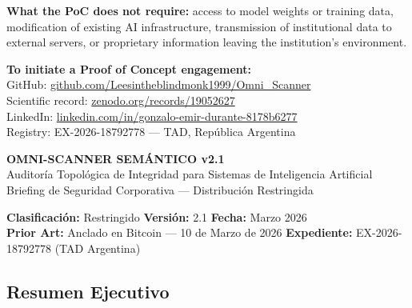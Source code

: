 \documentclass[11pt, a4paper]{article}
\begin{document}
\textbf{What the PoC does not require:} access to model weights or training
data, modification of existing AI infrastructure, transmission of institutional
data to external servers, or proprietary information leaving the institution's
environment.

\begin{statbox}
\textbf{To initiate a Proof of Concept engagement:}\\[4pt]
GitHub: \href{https://github.com/Leesintheblindmonk1999/Omni_Scanner}%
  {github.com/Leesintheblindmonk1999/Omni\_Scanner}\\
Scientific record: \href{https://zenodo.org/records/19052627}%
  {zenodo.org/records/19052627}\\
LinkedIn: \href{https://www.linkedin.com/in/gonzalo-emir-durante-8178b6277}%
  {linkedin.com/in/gonzalo-emir-durante-8178b6277}\\
Registry: EX-2026-18792778 --- TAD, Rep\'{u}blica Argentina
\end{statbox}

\newpage
\hypertarget{sec:es}{}

\begin{center}
{\Large\bfseries\color{darkgray} OMNI-SCANNER SEMÁNTICO v2.1}\\[6pt]
{\large\color{duranteamber}
  Auditoría Topológica de Integridad para Sistemas de Inteligencia Artificial}\\[4pt]
{\normalsize\color{darkgray}
  Briefing de Seguridad Corporativa --- Distribución Restringida}\\[8pt]
\end{center}
\vspace{4pt}

\begin{statbox}
\centering
\textbf{Clasificación:} Restringido \quad
\textbf{Versión:} 2.1 \quad
\textbf{Fecha:} Marzo 2026\\
\textbf{Prior Art:} Anclado en Bitcoin --- 10 de Marzo de 2026 \quad
\textbf{Expediente:} EX-2026-18792778 (TAD Argentina)
\end{statbox}

\subsection*{Resumen Ejecutivo}
\end{document}
